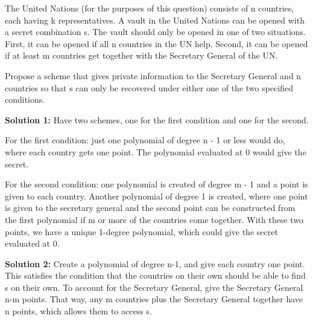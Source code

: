 \question The United Nations (for the purposes of this question) consists of n countries, each having k representatives.
A vault in the United Nations can be opened with a secret combination s. The vault should
only be opened in one of two situations. First, it can be opened if all n countries in the UN help.
Second, it can be opened if at least m countries get together with the Secretary General of the UN.

Propose a scheme that gives private information to the Secretary General and n countries so that s can
only be recovered under either one of the two specified conditions.

 
\begin{solution}
\textbf{Solution 1: }
Have two schemes, one for the first condition and one for the second.

For the first condition: just one polynomial of degree n - 1 or less would do, where each country gets one point. The polynomial evaluated at 0 would give the secret.

For the second condition: one polynomial is created of degree m - 1 and a point is given to each
country. Another polynomial of degree 1 is created, where one point is given to the secretary general
and the second point can be constructed from the first polynomial if m or more of the countries come
together. With these two points, we have a unique 1-degree polynomial, which could give the secret
evaluated at 0.

\textbf{Solution 2: }
Create a polynomial of degree n-1, and give each country one point. This satisfies the condition that the countries on their own should be able to find s on their own. To account for the Secretary General, give the Secretary General n-m points. That way, any m countries plus the Secretary General together have n points, which allows them to access s.
\end{solution}
\newpage